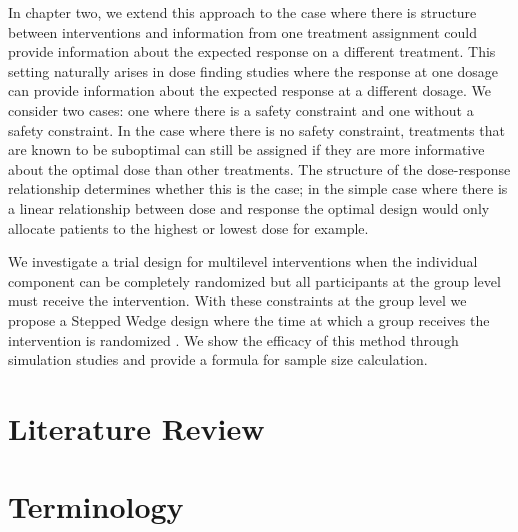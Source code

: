 \documentclass[12pt,,letterpaper,twoside]{report}
\begin{document}
In chapter two, we extend this approach to the case where there is
structure between interventions and information from one treatment
assignment could provide information about the expected response on a
different treatment. This setting naturally arises in dose finding
studies where the response at one dosage can provide information about
the expected response at a different dosage. We consider two cases: one
where there is a safety constraint and one without a safety constraint.
In the case where there is no safety constraint, treatments that are
known to be suboptimal can still be assigned if they are more
informative about the optimal dose than other treatments. The structure
of the dose-response relationship determines whether this is the case;
in the simple case where there is a linear relationship between dose and
response the optimal design would only allocate patients to the highest
or lowest dose for example.

We investigate a trial design for multilevel interventions when the
individual component can be completely randomized but all participants
at the group level must receive the intervention. With these constraints
at the group level we propose a Stepped Wedge design where the time at
which a group receives the intervention is randomized
\citep{gambia1987gambia, hussey2007design}. We show the efficacy of this
method through simulation studies and provide a formula for sample size
calculation.

\hypertarget{literature-review}{%
\section{Literature Review}\label{literature-review}}

\hypertarget{terminology}{%
\section{Terminology}\label{terminology}}
\end{document}
